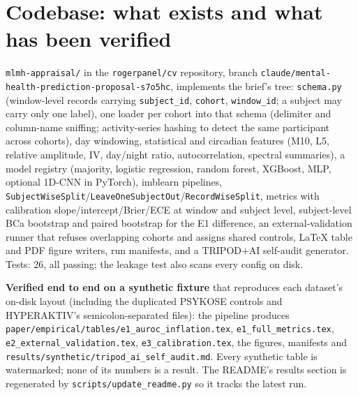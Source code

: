 \documentclass[11pt,a4paper]{article}
\begin{document}
\section{Codebase: what exists and what has been verified}
\texttt{mlmh-appraisal/} in the \texttt{rogerpanel/cv} repository, branch
\texttt{claude/mental-health-prediction-proposal-s7o5hc}, implements the brief's tree:
\texttt{schema.py} (window-level records carrying \texttt{subject\_id}, \texttt{cohort},
\texttt{window\_id}; a subject may carry only one label), one loader per cohort into that schema
(delimiter and column-name sniffing; activity-series hashing to detect the same participant across
cohorts), day windowing, statistical and circadian features (M10, L5, relative amplitude, IV,
day/night ratio, autocorrelation, spectral summaries), a model registry (majority, logistic
regression, random forest, XGBoost, MLP, optional 1D-CNN in PyTorch), imblearn pipelines,
\texttt{SubjectWiseSplit}/\texttt{LeaveOneSubjectOut}/\texttt{RecordWiseSplit}, metrics with calibration
slope/intercept/Brier/ECE at window and subject level, subject-level BCa bootstrap and paired
bootstrap for the E1 difference, an external-validation runner that refuses overlapping cohorts and
assigns shared controls, LaTeX table and PDF figure writers, run manifests, and a TRIPOD+AI
self-audit generator. Tests: 26, all passing; the leakage test also scans every config on disk.

\textbf{Verified end to end on a synthetic fixture} that reproduces each dataset's on-disk layout
(including the duplicated PSYKOSE controls and HYPERAKTIV's semicolon-separated files): the
pipeline produces \texttt{paper/empirical/tables/e1\_auroc\_inflation.tex},
\texttt{e1\_full\_metrics.tex}, \texttt{e2\_external\_validation.tex}, \texttt{e3\_calibration.tex},
the figures, manifests and \texttt{results/synthetic/tripod\_ai\_self\_audit.md}. Every synthetic
table is watermarked; none of its numbers is a result. The README's results section is regenerated
by \texttt{scripts/update\_readme.py} so it tracks the latest run.
\end{document}
